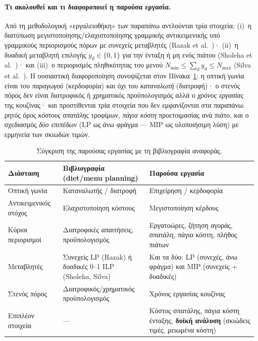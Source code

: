 \documentclass[11pt,a4paper]{article}
\newcommand{\en}[1]{\textenglish{#1}}
\begin{document}
\paragraph{Τι ακολουθεί και τι διαφοροποιεί η παρούσα εργασία.}
Από τη μεθοδολογική «εργαλειοθήκη» των παραπάνω αντλούνται τρία στοιχεία: (i)~η
διατύπωση μεγιστοποίησης/ελαχιστοποίησης γραμμικής αντικειμενικής υπό γραμμικούς
περιορισμούς πόρων με συνεχείς μεταβλητές (\en{Razak et al.}~\cite{razak})· (ii)~η
δυαδική μεταβλητή επιλογής $y_d\in\{0,1\}$ για την ένταξη ή μη ενός πιάτου
(\en{Sholeha et al.}~\cite{sholeha})· και (iii)~ο περιορισμός πληθικότητας του μενού
$N_{\min}\le\sum_d y_d\le N_{\max}$ (\en{Silva et al.}~\cite{silva}). Η ουσιαστική
διαφοροποίηση συνοψίζεται στον
Πίνακα~\ref{tab:lit}: η οπτική γωνία είναι του \emph{παραγωγού} (κερδοφορία) και
όχι του \emph{καταναλωτή} (διατροφή)· ο στενός πόρος δεν είναι διατροφικός ή
χρηματικός προϋπολογισμός αλλά ο \emph{χρόνος εργασίας} της κουζίνας· και
προστίθενται τρία στοιχεία που δεν εμφανίζονται στα παραπάνω: ρητός όρος
\emph{κόστους σπατάλης} τροφίμων, \emph{πάγια κόστη} προετοιμασίας ανά πιάτο, και
ο σχεδιασμός \emph{δύο επιπέδων} (\en{LP} ως άνω φράγμα — \en{MIP} ως υλοποιήσιμη
λύση) με ερμηνεία των σκιωδών τιμών.

\begin{table}[htbp]
\centering
\caption{Σύγκριση της παρούσας εργασίας με τη βιβλιογραφία αναφοράς.}
\label{tab:lit}
\small
\begin{tabular}{@{}p{3.1cm}p{5.0cm}p{5.5cm}@{}}
\toprule
\textbf{Διάσταση} & \textbf{Βιβλιογραφία (\en{diet}/\en{menu planning})} & \textbf{Παρούσα εργασία}\\
\midrule
Οπτική γωνία & Καταναλωτής / διατροφή & Επιχείρηση / κερδοφορία\\
Αντικειμενικός στόχος & Ελαχιστοποίηση κόστους & Μεγιστοποίηση κέρδους\\
Κύριοι περιορισμοί & Διατροφικές απαιτήσεις, προϋπολογισμός & Εργατοώρες, ζήτηση αγοράς, σπατάλη, πάγια κόστη, πλήθος πιάτων\\
Μεταβλητές & Συνεχείς \en{LP} (\en{Razak}) ή δυαδικές 0--1 \en{ILP} (\en{Sholeha}, \en{Silva}) & Και τα δύο: \en{LP} (συνεχές, άνω φράγμα) και \en{MIP} (συνεχείς + δυαδικές)\\
Στενός πόρος & Διατροφικός/χρηματικός προϋπολογισμός & Χρόνος εργασίας κουζίνας\\
Επιπλέον στοιχεία & --- & Κόστος σπατάλης, πάγια κόστη ένταξης, \textbf{δυϊκή ανάλυση} (σκιώδεις τιμές, μειωμένα κόστη)\\
\bottomrule
\end{tabular}
\end{table}
\end{document}
